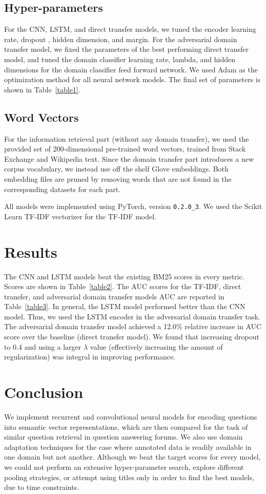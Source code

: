 \documentclass[11pt,a4paper]{article}
\begin{document}
\subsection*{Hyper-parameters}
For the CNN, LSTM, and direct transfer models, we tuned the encoder learning rate, dropout \cite{hinton}, hidden dimension, and margin. For the adversarial domain transfer model, we fixed the parameters of the best performing direct transfer model, and tuned the domain classifier learning rate, lambda, and hidden dimensions for the domain classifier feed forward network. We used Adam \cite{kingma} as the optimization method for all neural network models. The final set of parameters is shown in Table~\ref{table1}. 

\subsection*{Word Vectors}
For the information retrieval part (without any domain transfer), we used the provided set of 200-dimensional pre-trained word vectors, trained from Stack Exchange and Wikipedia text. Since the domain transfer part introduces a new corpus vocabulary, we instead use off the shelf Glove \cite{pennington} embeddings. Both embedding files are pruned by removing words that are not found in the corresponding datasets for each part. 

All models were implemented using PyTorch, version \texttt{0.2.0\_3}. We used the Scikit Learn TF-IDF vectorizer for the TF-IDF model.

\section{Results}
The CNN and LSTM models beat the existing BM25 scores in every metric. Scores are shown in Table~\ref{table2}. The AUC scores for the TF-IDF, direct transfer, and adversarial domain transfer models AUC are reported in Table~\ref{table3}. In general, the LSTM model performed better than the CNN model. Thus, we used the LSTM encoder in the adversarial domain transfer task. The adversarial domain transfer model achieved a 12.0\% relative increase in AUC score over the baseline (direct transfer model). We found that increasing dropout to 0.4 and using a larger $\lambda$ value (effectively increasing the amount of regularization) was integral in improving performance. 

\section{Conclusion}
We implement recurrent and convolutional neural models for encoding questions into semantic vector representations, which are then compared for the task of similar question retrieval in question answering forums. We also use domain adaptation techniques for the case where annotated data is readily available in one domain but not another. Although we beat the target scores for every model, we could not perform an extensive hyper-parameter search, explore different pooling strategies, or attempt using titles only in order to find the best models, due to time constraints. 
\end{document}
